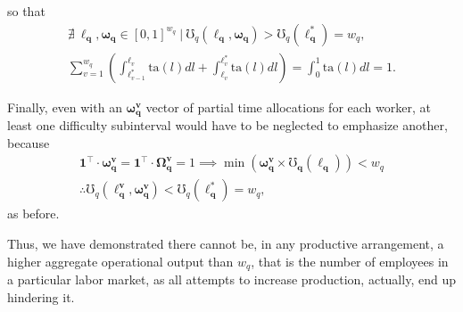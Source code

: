 \documentclass[hidelinks, nonatbib]{elsarticle}
\begin{document}
so that 
\begin{gather}
    \nexists
    \
    \boldsymbol{\ell_q}
    ,
    \boldsymbol{\omega_q}
    \in
    [0,1]^{w_q}
    \
    \big|
    \
    \mho_{q}(
        \boldsymbol{\ell_q}
        ,\boldsymbol{\omega_q}
    ) 
    >
    \mho_{q}(
        \boldsymbol{\ell_{q}^{*}}
    )
    =
    w_q
    ,
    \\
    \sum_{v=1}^{w_q}
    \left(
        \int_{
            \ell_{v-1}^{*}
        }^{
            \ell_{v}
        }
        \text{ta}(l)dl
        +
        \int_{
            \ell_{v}
        }^{
            \ell_{v}^{*}
        }
        \text{ta}(l)dl
    \right)
    =
    \int_{0}^{1}
    \text{ta}(l)dl
    =
    1
    .
\end{gather}

Finally, even with an $\boldsymbol{\omega_{q}^{v}}$ vector of partial time allocations for each worker, at least one difficulty subinterval would have to be neglected to emphasize another, because
\begin{gather}
    \boldsymbol{1} ^ \top
    \cdot
    \boldsymbol{\omega_{q}^{v}}
    =
    \boldsymbol{1} ^ \top
    \cdot
    \boldsymbol{\Omega_{q}^{v}}
    =
    1
    \implies
    \min\left(
        \boldsymbol{\omega_{q}^{v}}
        \times
        \boldsymbol{\mho_q}(
            \boldsymbol{\ell_{q}}
        )
    \right)
    <
    w_q
    \\
    \therefore
    \mho_q(
        \boldsymbol{\ell_{q}^{v}},
        \boldsymbol{\omega_{q}^{v}}
    )
    <
    \mho_q(
        \boldsymbol{\ell_{q}^{*}}
    )
    =
    w_q
    ,
\end{gather}
as before.

Thus, we have demonstrated there cannot be, in any productive arrangement, a higher aggregate operational output than $w_q$, that is the number of employees in a particular labor market, as all attempts to increase production, actually, end up hindering it. 
\end{document}
